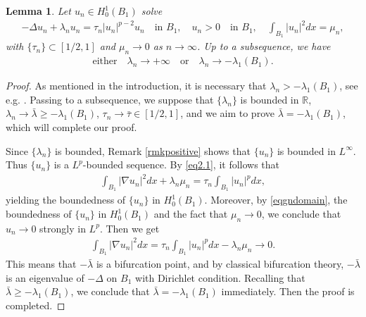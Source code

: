 \documentclass[10pt,a4paper]{article}
\newtheorem{lemma}[theorem]{Lemma}
\theoremstyle{definition} \theoremstyle{remark}
\numberwithin{equation}{section}
\newcommand{\R}{\mathbb{R}}
\newcommand{\la}{\lambda}
\begin{document}
\begin{lemma} \label{lemboundedla}
	Let $u_n \in H_0^1(B_1)$ solve
	\begin{align} \label{eq2.1}
		-\Delta u_n + \la_n u_n = \tau_n|u_n|^{p-2}u_n \quad \text{in } B_1, \quad u_n > 0 \quad \text{in } B_1, \quad \int_{B_1}|u_n|^2dx = \mu_n,
	\end{align}
    with $\{\tau_n\} \subset [1/2,1]$ and $\mu_n \to 0$ as $n \to \infty$. Up to a subsequence, we have
    \begin{align*}
    	\text{either} \quad \la_n \to +\infty \quad \text{or} \quad \la_n \to - \la_1(B_1).
    \end{align*}
\end{lemma}

\begin{proof}
	As mentioned in the introduction, it is necessary that $\la_n > -\la_1(B_1)$, see e.g. \cite[Theorem 1.19]{Willem}. Passing to a subsequence, we suppose that $\{\la_n\}$ is bounded in $\R$, $\la_n \to \bar \la \geq -\la_1(B_1)$, $\tau_n \to \bar \tau \in [1/2,1]$, and we aim to prove $\bar \la = -\la_1(B_1)$, which will complete our proof.
	
	Since $\{\la_n\}$ is bounded, Remark \ref{rmkpositive} shows that $\{u_n\}$ is bounded in $L^\infty$. Thus $\{u_n\}$ is a $L^p$-bounded sequence. By \eqref{eq2.1}, it follows that
	\begin{align*}
		\int_{B_1} |\nabla u_n|^2dx + \la_n \mu_n = \tau_n\int_{B_1}|u_n|^pdx,
	\end{align*}
    yielding the boundedness of $\{u_n\}$ in $H_0^1(B_1)$. Moreover, by \eqref{eqgndomain}, the boundedness of $\{u_n\}$ in $H_0^1(B_1)$ and the fact that $\mu_n \to 0$, we conclude that $u_n \to 0$ strongly in $L^p$. Then we get
    \begin{align*}
    	\int_{B_1} |\nabla u_n|^2dx = \tau_n\int_{B_1}|u_n|^pdx - \la_n \mu_n \to 0.
    \end{align*}
    This means that $-\bar \la$ is a bifurcation point, and by classical bifurcation theory, $-\bar \la$ is an eigenvalue of $-\Delta$ on $B_1$ with Dirichlet condition. Recalling that $\bar \la \geq -\la_1(B_1)$, we conclude that $\bar \la = -\la_1(B_1)$ immediately. Then the proof is completed.
\end{proof}
\end{document}
